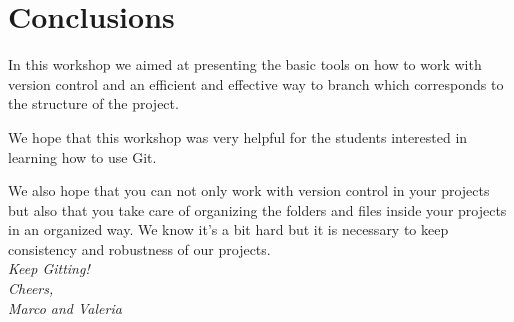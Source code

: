 


\section{Conclusions}

In this workshop we aimed at presenting the basic tools on how to work with version control and an efficient and effective way to branch which corresponds to the structure of the project. 

We hope that this workshop was very helpful for the students interested in learning how to use Git.

We also hope that you can not only work with version control in your projects but also that you take care of organizing the folders and files inside your projects in an organized way. We know it's a bit hard but it is necessary to keep consistency and robustness of our projects. \\

\noindent\textit{Keep Gitting! \\ Cheers, \\ Marco and Valeria}



